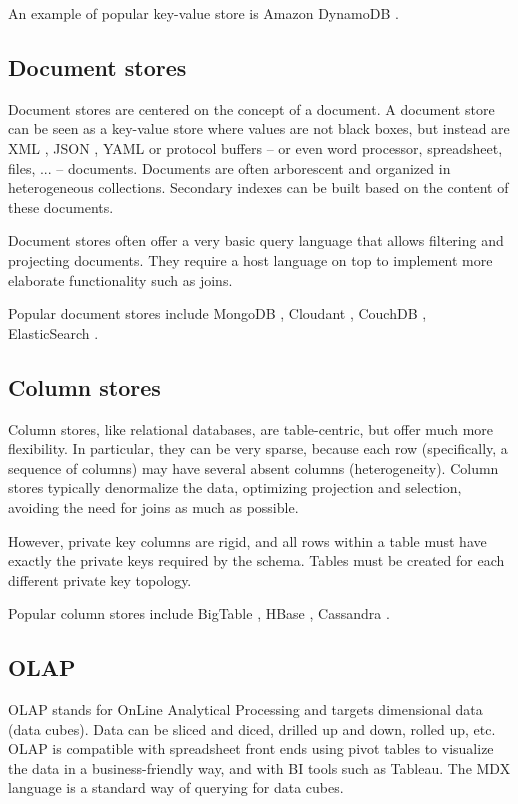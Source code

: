 \documentclass{acm_proc_article-sp}
\begin{document}
An example of popular key-value store is Amazon DynamoDB \cite{DeCandia2007}.

\subsection{Document stores}

Document stores are centered on the concept of a document. A document store can be seen as a key-value store where values are not black boxes, but instead are XML \cite{XML}, JSON \cite{JSON}, YAML \cite{YAML} or protocol buffers \cite{ProtocolBuffers} -- or even word processor, spreadsheet, files, ... -- documents. Documents are often arborescent and organized in heterogeneous collections. Secondary indexes can be built based on the content of these documents.

Document stores often offer a very basic query language that allows filtering and projecting documents. They require a host language on top to implement more elaborate functionality such as joins. 

Popular document stores include MongoDB \cite{MongoDB}, Cloudant \cite{Cloudant}, CouchDB \cite{CouchDB}, ElasticSearch \cite{ElasticSearch}.

\subsection{Column stores}

Column stores, like relational databases, are table-centric, but offer much more flexibility. In particular, they can be very sparse, because each row (specifically, a sequence of columns) may have several absent columns (heterogeneity). Column stores typically denormalize the data, optimizing projection and selection, avoiding the need for joins as much as possible.

However, private key columns are rigid, and all rows within a table must have exactly the private keys required by the schema. Tables must be created for each different private key topology.

Popular column stores include BigTable \cite{Chang2008}, HBase \cite{HBase}, Cassandra \cite{Lakshman2010}.

\subsection{OLAP}

OLAP \cite{Codd1993} stands for OnLine Analytical Processing and targets dimensional data (data cubes). Data can be sliced and diced, drilled up and down, rolled up, etc. OLAP is compatible with spreadsheet front ends using pivot tables to visualize the data in a business-friendly way, and with BI tools such as Tableau. The MDX language \cite{Nolan1999} is a standard way of querying for data cubes.
\end{document}
